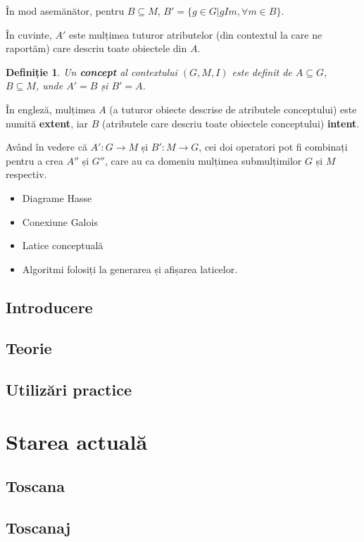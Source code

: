\documentclass[12pt, a4paper, twoside, romanian]{teza-upb}
\newtheorem{defn}{Definiție}
\begin{document}
    În mod asemănător, pentru $B \subseteq M$, $B' = \{g \in G | gIm, \forall m \in B \}$.

    În cuvinte, $A'$ este mulțimea tuturor atributelor (din contextul la care ne raportăm) care descriu toate obiectele din $A$.

    \begin{defn}
      Un \textbf{concept} al contextului $(G, M, I)$ este definit de $A \subseteq G$, $B \subseteq M$, unde $A' = B$ și $B' = A$.
    \end{defn}

    În engleză, mulțimea $A$ (a tuturor obiecte descrise de atributele conceptului) este numită \textbf{extent}, iar $B$ (atributele care descriu toate obiectele conceptului) \textbf{intent}.

    Având în vedere că $ A': G \rightarrow M$ și $B' : M \rightarrow G$, cei doi operatori pot fi combinați pentru a crea $A''$ și $G''$, care au ca domeniu mulțimea submulțimilor $G$ și $M$ respectiv.

    \begin{itemize}
      \item Diagrame Hasse
      \item Conexiune Galois
      \item Latice conceptuală
      \item Algoritmi folosiți la generarea și afișarea laticelor.
    \end{itemize}

  \section{Introducere}
  \section{Teorie}
  \section{Utilizări practice}

\chapter{Starea actuală}
  \section{Toscana}
  \section{Toscanaj}
\end{document}
